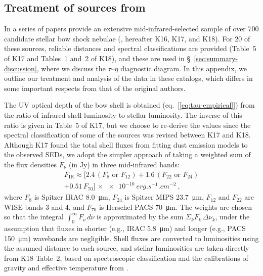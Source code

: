 \subsection{Treatment of sources from \citeauthor{Kobulnicky:2018a}}
\label{sec:kobulnicky}


In a series of papers \citeauthor{Kobulnicky:2018a} provide an
extensive mid-infrared-selected sample of over 700 candidate stellar
bow shock nebulae (\citealp{Kobulnicky:2016a, Kobulnicky:2017a,
  Kobulnicky:2018a}, hereafter K16, K17, and K18).  For 20 of these
sources, reliable distances and spectral classifications are provided
(Table~5 of K17 and Tables~1 and~2 of K18), and these are used in
\S~\ref{sec:summary-discussion}, where we discuss the
\(\tau\)--\(\eta\) diagnostic diagram.  In this appendix, we outline our
treatment and analysis of the data in these catalogs, which differs in
some important respects from that of the original authors.

The UV optical depth of the bow shell is obtained
(eq.~[\ref{eq:tau-empirical}]) from the ratio of infrared shell
luminosity to stellar luminosity.  The inverse of this ratio is given
in Table~5 of K17, but we choose to re-derive the values since the
spectral classification of some of the sources was revised between K17
and K18.  Although K17 found the total shell fluxes from fitting dust
emission models to the observed SEDs, we adopt the simpler approach of
taking a weighted sum of the flux densities \(F_\nu\) (in \si{Jy}) in
three mid-infrared bands:
\begin{multline}
  \label{eq:total-ir-flux}
  F_{\text{IR}}  \approx \bigl[  2.4\,(F_8 \text{ or } F_{12})
    + 1.6\,(F_{22} \text{ or } F_{24})  \\
  + 0.51\,F_{70}\bigr]
  \,\times \SI{e-10}{erg.s^{-1}.cm^{-2}} \ ,
\end{multline}
where \(F_8\) is Spitzer IRAC \SI{8.0}{\um}, \(F_{24}\) is Spitzer
MIPS \SI{23.7}{\um}, \(F_{12}\) and \(F_{22}\) are WISE bands 3 and 4,
and \(F_{70}\) is Herschel PACS \SI{70}{\um}.  The weights are chosen
so that the integral \(\int_0^\infty F_\nu \,d\nu\) is approximated by the sum
\(\Sigma_k F_k\, \Delta\nu_k\), under the assumption that fluxes in shorter (e.g.,
IRAC \SI{5.8}{\um}) and longer (e.g., PACS \SI{150}{\um}) wavebands
are negligible.  Shell fluxes are converted to luminosities using the
assumed distance to each source, and stellar luminosities are taken
directly from K18 Table~2, based on spectroscopic classification and
the calibrations of gravity and effective temperature from
\citet{Martins:2005a}.  

